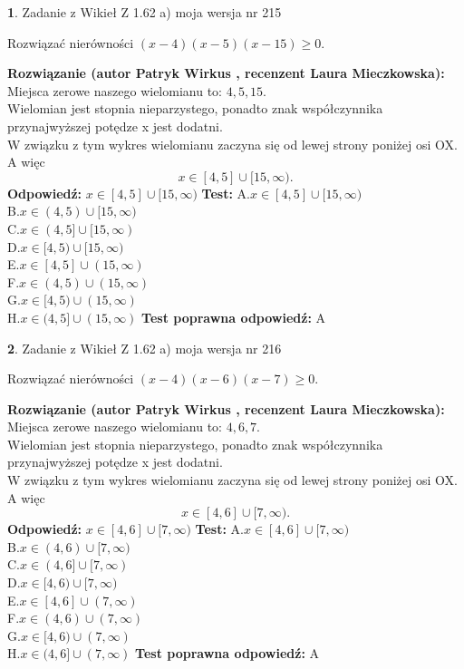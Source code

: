 \documentclass[12pt, a4paper]{article}
\theoremstyle{definition} %
\newtheorem{zad}{}
\newcommand{\zadStart}[1]{\begin{zad}#1\newline}
\newcommand{\zadStop}{\end{zad}}
\newcommand{\rozwStart}[2]{\noindent \textbf{Rozwiązanie (autor #1 , recenzent #2): }\newline}
\newcommand{\rozwStop}{\newline}
\newcommand{\odpStart}{\noindent \textbf{Odpowiedź:}\newline}
\newcommand{\odpStop}{\newline}
\newcommand{\testStart}{\noindent \textbf{Test:}\newline}
\newcommand{\testStop}{\newline}
\newcommand{\kluczStart}{\noindent \textbf{Test poprawna odpowiedź:}\newline}
\newcommand{\kluczStop}{\newline}
\begin{document}
\zadStart{Zadanie z Wikieł Z 1.62 a) moja wersja nr 215}

Rozwiązać nierówności $(x-4)(x-5)(x-15)\ge0$.
\zadStop
\rozwStart{Patryk Wirkus}{Laura Mieczkowska}
Miejsca zerowe naszego wielomianu to: $4, 5, 15$.\\
Wielomian jest stopnia nieparzystego, ponadto znak współczynnika przy\linebreak najwyższej potędze x jest dodatni.\\ W związku z tym wykres wielomianu zaczyna się od lewej strony poniżej osi OX. A więc $$x \in [4,5] \cup [15,\infty).$$
\rozwStop
\odpStart
$x \in [4,5] \cup [15,\infty)$
\odpStop
\testStart
A.$x \in [4,5] \cup [15,\infty)$\\
B.$x \in (4,5) \cup [15,\infty)$\\
C.$x \in (4,5] \cup [15,\infty)$\\
D.$x \in [4,5) \cup [15,\infty)$\\
E.$x \in [4,5] \cup (15,\infty)$\\
F.$x \in (4,5) \cup (15,\infty)$\\
G.$x \in [4,5) \cup (15,\infty)$\\
H.$x \in (4,5] \cup (15,\infty)$
\testStop
\kluczStart
A
\kluczStop



\zadStart{Zadanie z Wikieł Z 1.62 a) moja wersja nr 216}

Rozwiązać nierówności $(x-4)(x-6)(x-7)\ge0$.
\zadStop
\rozwStart{Patryk Wirkus}{Laura Mieczkowska}
Miejsca zerowe naszego wielomianu to: $4, 6, 7$.\\
Wielomian jest stopnia nieparzystego, ponadto znak współczynnika przy\linebreak najwyższej potędze x jest dodatni.\\ W związku z tym wykres wielomianu zaczyna się od lewej strony poniżej osi OX. A więc $$x \in [4,6] \cup [7,\infty).$$
\rozwStop
\odpStart
$x \in [4,6] \cup [7,\infty)$
\odpStop
\testStart
A.$x \in [4,6] \cup [7,\infty)$\\
B.$x \in (4,6) \cup [7,\infty)$\\
C.$x \in (4,6] \cup [7,\infty)$\\
D.$x \in [4,6) \cup [7,\infty)$\\
E.$x \in [4,6] \cup (7,\infty)$\\
F.$x \in (4,6) \cup (7,\infty)$\\
G.$x \in [4,6) \cup (7,\infty)$\\
H.$x \in (4,6] \cup (7,\infty)$
\testStop
\kluczStart
A
\kluczStop
\end{document}
